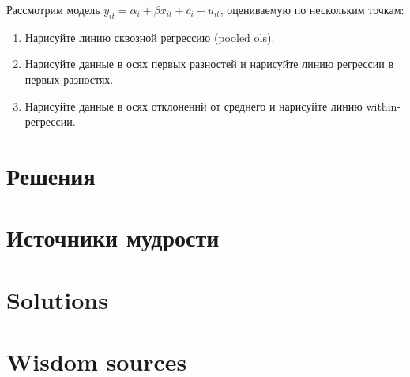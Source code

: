 \begin{problem}
Рассмотрим модель $y_{it} = \alpha_i + \beta x_{it} + c_i + u_{it}$, оцениваемую по нескольким точкам:



    \begin{enumerate}
\item Нарисуйте линию сквозной регрессию (pooled ols).
\item Нарисуйте данные в осях первых разностей и нарисуйте линию регрессии в первых разностях.
\item Нарисуйте данные в осях отклонений от среднего и нарисуйте линию within-регрессии.
    \end{enumerate}
\begin{sol}
\end{sol}
\end{problem}






\renewenvironment{solution}[1]{%
         \vskip .5cm plus 2cm minus 0.1cm%
         {\bfseries \hyperlink{problem:#1}{#1.}}%
}%
{%
}%

\begin{translation-ru}
    \section{Решения}    
    

    \section{Источники мудрости}
    \printbibliography[heading=none]    
\end{translation-ru}

\begin{translation-en}
    \section{Solutions}    
    

    \section{Wisdom sources}
    \printbibliography[heading=none]    
\end{translation-en}

